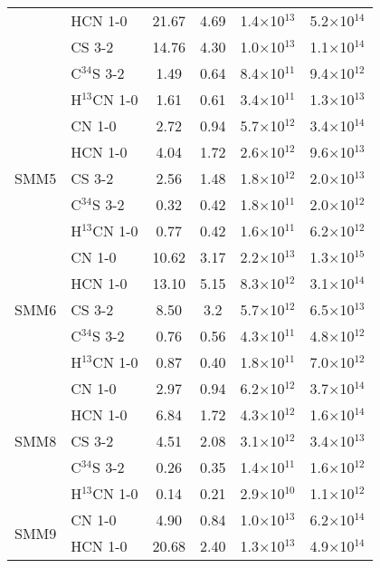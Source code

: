 \documentclass{aa}
\begin{document}
\begin{appendix}
\begin{table*}
\begin{tabular}{l l c c c c}
     {} & HCN 1-0 & 21.67 & 4.69 & 1.4$\times$10$^{13}$ & 5.2$\times$10$^{14}$\\
      {} & CS 3-2 & 14.76 & 4.30 & 1.0$\times$10$^{13}$ & 1.1$\times$10$^{14}$\\
       {} & C$^{34}$S 3-2 & 1.49 & 0.64 & 8.4$\times$10$^{11}$ & 9.4$\times$10$^{12}$\\
        {} & H$^{13}$CN 1-0 & 1.61 & 0.61 & 3.4$\times$10$^{11}$ & 1.3$\times$10$^{13}$\\ 
        \hline \multirow{5}{*}{SMM5} & CN 1-0 & 2.72 & 0.94 & 5.7$\times$10$^{12}$ & 3.4$\times$10$^{14}$\\
         {} & HCN 1-0 & 4.04 & 1.72 & 2.6$\times$10$^{12}$ & 9.6$\times$10$^{13}$\\ 
         {} & CS 3-2 & 2.56 & 1.48 & 1.8$\times$10$^{12}$ & 2.0$\times$10$^{13}$\\ 
{} & C$^{34}$S 3-2 & 0.32 & 0.42 & 1.8$\times$10$^{11}$ & 2.0$\times$10$^{12}$ \\ 
{} & H$^{13}$CN 1-0 & 0.77 & 0.42  & 1.6$\times$10$^{11}$ & 6.2$\times$10$^{12}$ \\
 \hline \multirow{5}{*}{SMM6} & CN 1-0 & 10.62 & 3.17 & 2.2$\times$10$^{13}$ & 1.3$\times$10$^{15}$\\
  {} & HCN 1-0 & 13.10 & 5.15 & 8.3$\times$10$^{12}$ & 3.1$\times$10$^{14}$\\ 
  {} & CS 3-2 & 8.50 & 3.2 & 5.7$\times$10$^{12}$ & 6.5$\times$10$^{13}$\\ 
  {} & C$^{34}$S 3-2 & 0.76 & 0.56 & 4.3$\times$10$^{11}$ & 4.8$\times$10$^{12}$ \\ 
  {} & H$^{13}$CN 1-0 & 0.87 & 0.40 & 1.8$\times$10$^{11}$ & 7.0$\times$10$^{12}$\\
   \hline \multirow{5}{*}{SMM8} & CN 1-0 & 2.97 & 0.94 & 6.2$\times$10$^{12}$ & 3.7$\times$10$^{14}$\\ 
   {} & HCN 1-0 & 6.84 & 1.72 & 4.3$\times$10$^{12}$ & 1.6$\times$10$^{14}$ \\ 
   {} & CS 3-2 & 4.51 & 2.08 & 3.1$\times$10$^{12}$ & 3.4$\times$10$^{13}$ \\
    {} & C$^{34}$S 3-2 & 0.26 & 0.35 & 1.4$\times$10$^{11}$ & 1.6$\times$10$^{12}$\\
     {} & H$^{13}$CN 1-0 & 0.14 & 0.21 & 2.9$\times$10$^{10}$ & 1.1$\times$10$^{12}$\\
      \hline \multirow{5}{*}{SMM9} & CN 1-0 & 4.90 & 0.84 & 1.0$\times$10$^{13}$ & 6.2$\times$10$^{14}$\\
       {} & HCN 1-0 & 20.68 & 2.40 & 1.3$\times$10$^{13}$ & 4.9$\times$10$^{14}$ \\ 

\end{tabular}
\end{table*}
\end{appendix}
\end{document}

